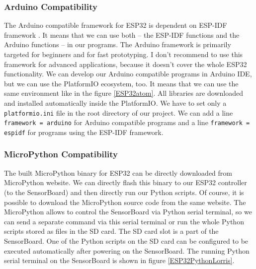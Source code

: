 \subsubsection{Arduino Compatibility}
The Arduino compatible framework for ESP32 \cite{espressif:ArduinoCore} is dependent on ESP-IDF framework \cite{espressif:ESP-IDF}. It means that we can use both -- the ESP-IDF functions and the Arduino functions -- in our programs. The Arduino framework is primarily targeted for beginners and for fast prototyping. I don't recommend to use this framework for advanced applications, because it doesn't cover the whole ESP32 functionality. We can develop our Arduino compatible programs in Arduino IDE, but we can use the PlatformIO ecosystem, too. It means that we can use the same environment like in the figure \ref{ESP32atom}. All libraries are downloaded and installed automatically inside the PlatformIO. We have to set only a \texttt{platformio.ini} file in the root directory of our project. We can add a line \texttt{framework = arduino} for Arduino compatible programs and a line \texttt{framework = espidf} for programs using the ESP-IDF framework.

\subsubsection{MicroPython Compatibility}
The built MicroPython binary for ESP32 can be directly downloaded from MicroPython website. \cite{MicroPython} We can directly flash this binary to our ESP32 controller (to the SensorBoard) and then directly run our Python scripts. Of course, it is possible to download the MicroPython source code from the same website. The MicroPython allows to control the SensorBoard via Python serial terminal, so we can send a separate command via this serial terminal or run the whole Python scripts stored as files in the SD card. The SD card slot is a part of the SensorBoard. One of the Python scripts on the SD card can be configured to be executed automatically after powering on the SensorBoard. The running Python serial terminal on the SensorBoard is shown in figure \ref{ESP32PythonLorris}.

